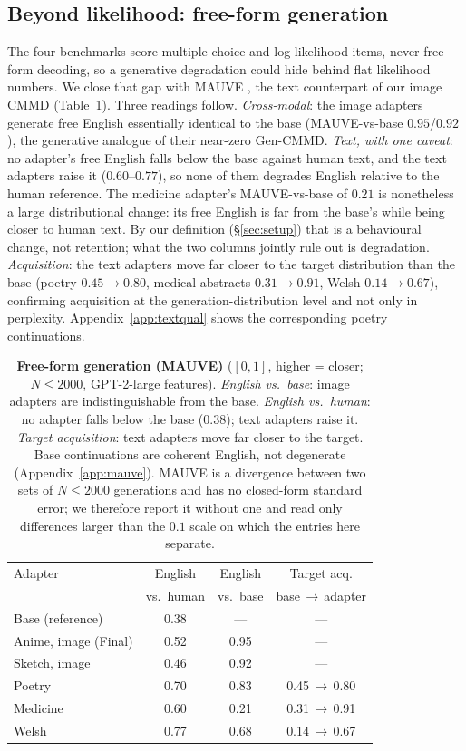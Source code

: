\documentclass{article}
\begin{document}
\subsection{Beyond likelihood: free-form generation}
The four benchmarks score multiple-choice and log-likelihood items, never
free-form decoding, so a generative degradation could hide behind flat
likelihood numbers. We close that gap with MAUVE \citep{pillutla2021mauve}, the
text counterpart of our image CMMD (Table~\ref{tab:mauve}). Three readings
follow. \emph{Cross-modal}: the image adapters generate free English essentially
identical to the base (MAUVE-vs-base $0.95$/$0.92$), the generative analogue of
their near-zero Gen-CMMD. \emph{Text, with one caveat}: no adapter's free English
falls below the base against human text, and the text adapters raise it
($0.60$--$0.77$), so none of them degrades English relative to the human
reference. The medicine adapter's MAUVE-vs-base of $0.21$ is nonetheless a large
distributional change: its free English is far from the base's while being closer
to human text. By our definition (\S\ref{sec:setup}) that is a behavioural
change, not retention; what the two columns jointly rule out is degradation.
\emph{Acquisition}: the text adapters move far closer to the target distribution
than the base (poetry $0.45\to0.80$, medical abstracts $0.31\to0.91$, Welsh
$0.14\to0.67$), confirming acquisition at the generation-distribution level and
not only in perplexity. Appendix~\ref{app:textqual} shows the corresponding
poetry continuations.

\begin{table}[t]
\caption{\textbf{Free-form generation (MAUVE)} \citep{pillutla2021mauve}
($[0,1]$, higher = closer; $N\!\le\!2000$, GPT-2-large features). \emph{English
vs.\ base}: image adapters are indistinguishable from the base. \emph{English
vs.\ human}: no adapter falls below the base ($0.38$); text adapters raise it.
\emph{Target acquisition}: text adapters move far closer to the target. Base
continuations are coherent English, not degenerate (Appendix~\ref{app:mauve}).
MAUVE is a divergence between two sets of $N\!\le\!2000$ generations and has no
closed-form standard error; we therefore report it without one and read only
differences larger than the $0.1$ scale on which the entries here separate.}
\label{tab:mauve}
\centering\small
\begin{tabular}{lccc}
\toprule
Adapter & English & English & Target acq. \\
        & vs.\ human & vs.\ base & base\,$\to$\,adapter \\
\midrule
Base (reference)        & 0.38 & --- & --- \\
Anime, image (Final)    & 0.52 & 0.95 & --- \\
Sketch, image           & 0.46 & 0.92 & --- \\
Poetry                  & 0.70 & 0.83 & 0.45\,$\to$\,0.80 \\
Medicine                & 0.60 & 0.21 & 0.31\,$\to$\,0.91 \\
Welsh                   & 0.77 & 0.68 & 0.14\,$\to$\,0.67 \\
\bottomrule
\end{tabular}
\end{table}
\end{document}
